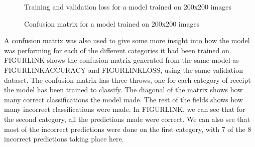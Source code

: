 \begin{figure}[h]
    \caption{Training and validation loss for a model trained on 200x200 images}
    \label{fig:200modelloss}
\end{figure}

\begin{figure}[h]
    \caption{Confusion matrix for a model trained on 200x200 images}
    \label{fig:200confusion}
\end{figure}

A confusion matrix was also used to give some more insight into how the model was performing for each of the different categories it had been trained on.
FIGURLINK shows the confusion matrix generated from the same model as FIGURLINKACCURACY and FIGURLINKLOSS, using the same validation dataset.
The confusion matrix has three throws, one for each category of receipt the model has been trained to classify.
The diagonal of the matrix shows how many correct classifications the model made.
The rest of the fields shows how many incorrect classifications were made.
In FIGURLINK, we can see that for the second category, all the predictions made were correct.
We can also see that most of the incorrect predictions were done on the first category, with 7 of the 8 incorrect predictions taking place here.

